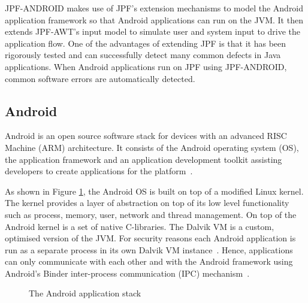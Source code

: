 \documentclass{acm_proc_article-sp}
\begin{document}
JPF-ANDROID makes use of JPF's extension mechanisms to model the Android application framework so that Android applications can run on the
JVM. It then extends JPF-AWT's input model to simulate user and system input to drive the application flow. One of the advantages of
extending JPF is that it has been rigorously tested and can successfully detect many common defects in Java applications. When Android applications
run on JPF using JPF-ANDROID, common software errors are automatically detected.


\subsection{Android}
Android is an open source software stack for devices with an advanced RISC Machine (ARM) architecture.
It consists of the Android operating system (OS), the application framework and an application development toolkit assisting developers to create
applications for the platform~\cite{AndroidDocs}.

As shown in Figure \ref{fig:android}, the Android OS is built on top of a modified Linux kernel. The kernel provides a layer of abstraction
on top of its low level functionality such as process, memory, user, network and thread management. On top of the Android kernel is a set of
native C-libraries. The Dalvik VM is a custom, optimised version of the JVM. For security reasons each Android application is run as a
separate process in its own Dalvik VM instance~\cite{AndroidSecurity}.  Hence, applications can only communicate with each other and with
the Android framework using Android's Binder inter-process communication (IPC) mechanism~\cite{Binder}. 

\begin{figure}
\centering
{}
\caption{The Android application stack~\cite{systemserver}}
\label{fig:android}
\end{figure}
\end{document}

